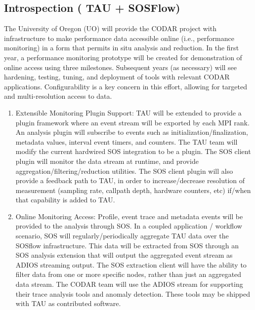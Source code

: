\subsection{Introspection ( TAU + SOSFlow)}
The University of Oregon (UO) will provide the CODAR project with infrastructure to make performance data accessible online (i.e., performance monitoring) in a form that permits in situ analysis and reduction. In the first year, a performance monitoring prototype will be created for demonstration of online access using three milestones. Subsequent years (as necessary) will see hardening, testing, tuning, and deployment of tools with relevant CODAR applications.  Configurability is a key concern in this effort, allowing for targeted and multi-resolution access to data.
\begin{enumerate}
\item Extensible Monitoring Plugin Support: TAU will be extended to provide a plugin framework where an event stream will be exported by each MPI rank. An analysis plugin will subscribe to events such as initialization/finalization, metadata values, interval event timers, and counters.  The TAU team will modify the current hardwired SOS integration to be a plugin. The SOS client plugin will monitor the data stream at runtime, and provide aggregation/filtering/reduction utilities.  The SOS client plugin will also provide a feedback path to TAU, in order to increase/decrease resolution of measurement (sampling rate, callpath depth, hardware counters, etc) if/when that capability is added to TAU.
\item Online Monitoring Access: Profile, event trace and metadata events will be provided to the analysis through SOS\cite{}. In a coupled application / workflow scenario, SOS will regularly/periodically aggregate TAU data over the SOSflow infrastructure.  This data will be extracted from SOS through an SOS analysis extension that will output the aggregated event stream as ADIOS streaming output.  The SOS extraction client will have the ability to filter data from one or more specific nodes, rather than just an aggregated data stream.  The CODAR team will use the ADIOS stream for supporting their trace analysis tools and anomaly detection. These tools may be shipped with TAU as contributed software.
\end{enumerate}

